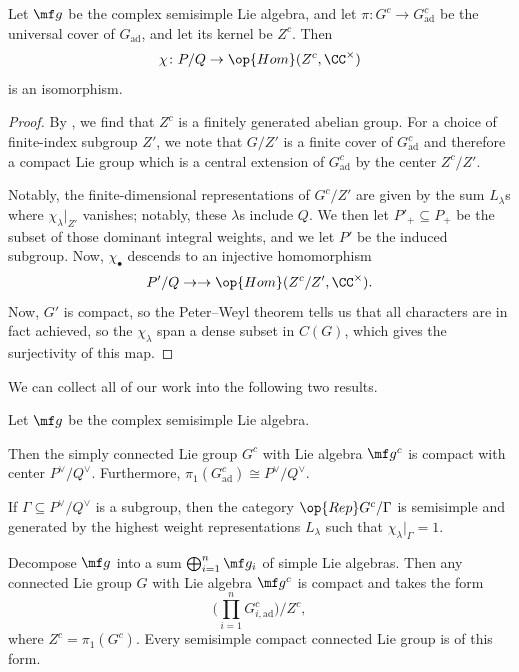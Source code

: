 \documentclass[../notes.tex]{subfiles}
\begin{document}
\begin{theorem} \label{thm:compute-pi1-compact-lie-group}
	Let $\mf g$ be the complex semisimple Lie algebra, and let $\pi\colon G^c\to G_{\mathrm{ad}}^c$ be the universal cover of $G_{\mathrm{ad}}$, and let its kernel be $Z^c$. Then
	\[\chi\colon P/Q\to\op{Hom}(Z^c,\CC^\times)\]
	is an isomorphism.
\end{theorem}
\begin{proof}
	By , we find that $Z^c$ is a finitely generated abelian group. For a choice of finite-index subgroup $Z'$, we note that $G/Z'$ is a finite cover of $G_{\mathrm{ad}}^c$ and therefore a compact Lie group which is a central extension of $G_{\mathrm{ad}}^c$ by the center $Z^c/Z'$.
	
	Notably, the finite-dimensional representations of $G^c/Z'$ are given by the sum $L_\lambda$s where $\chi_\lambda|_{Z'}$ vanishes; notably, these $\lambda$s include $Q$. We then let $P'_+\subseteq P_+$ be the subset of those dominant integral weights, and we let $P'$ be the induced subgroup. Now, $\chi_\bullet$ descends to an injective homomorphism
	\[P'/Q\to\to\op{Hom}(Z^c/Z',\CC^\times).\]
	Now, $G'$ is compact, so the Peter--Weyl theorem tells us that all characters are in fact achieved, so the $\chi_\lambda$ span a dense subset in $C(G)$, which gives the surjectivity of this map.
\end{proof}
We can collect all of our work into the following two results.
\begin{corollary} \label{cor:classify-semisimple-compact}
	Let $\mf g$ be the complex semisimple Lie algebra.
	\begin{listalph}
		\item Then the simply connected Lie group $G^c$ with Lie algebra $\mf g^c$ is compact with center $P^\lor/Q^\lor$. Furthermore, $\pi_1(G_{\mathrm{ad}}^c)\cong P^\lor/Q^\lor$.
		\item If $\Gamma\subseteq P^\lor/Q^\lor$ is a subgroup, then the category $\op{Rep}G^c/\Gamma$ is semisimple and generated by the highest weight representations $L_\lambda$ such that $\chi_\lambda|_\Gamma=1$.
		\item Decompose $\mf g$ into a sum $\bigoplus_{i=1}^n\mf g_i$ of simple Lie algebras. Then any connected Lie group $G$ with Lie algebra $\mf g^c$ is compact and takes the form
		\[\Bigg(\prod_{i=1}^nG_{i,\mathrm{ad}}^c\Bigg)/Z^c,\]
		where $Z^c=\pi_1(G^c)$. Every semisimple compact connected Lie group is of this form.
	\end{listalph}
\end{corollary}
\end{document}
